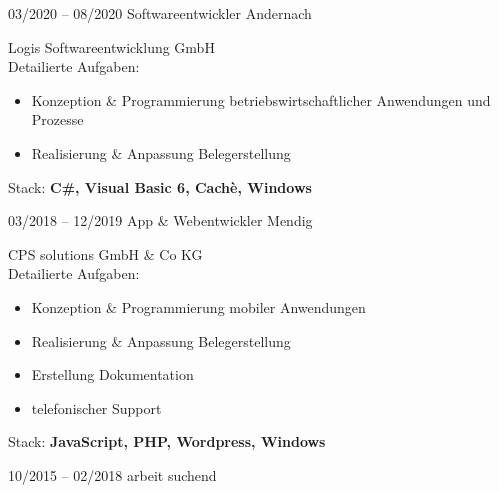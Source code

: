 \documentclass[a4paper]{friggeri-cv} %
\begin{document}
\begin{entrylist}
\entry
{03/2020 -- 08/2020}
{Softwareentwickler}
{Andernach}
{Logis Softwareentwicklung GmbH\\
	Detailierte Aufgaben:
	\begin{itemize}
		\item Konzeption \& Programmierung betriebswirtschaftlicher Anwendungen und Prozesse
		\item Realisierung \& Anpassung Belegerstellung
	\end{itemize}
	Stack: \textbf{C\#, Visual Basic 6, Cachè, Windows}
}
\entry
{03/2018 -- 12/2019}
{App \& Webentwickler}
{Mendig}
{CPS solutions GmbH \& Co KG\\
	Detailierte Aufgaben:
	\begin{itemize}
		\item Konzeption \& Programmierung mobiler Anwendungen
		\item Realisierung \& Anpassung Belegerstellung
        	\item Erstellung Dokumentation
        	\item telefonischer Support
	\end{itemize}
	Stack: \textbf{JavaScript, PHP, Wordpress, Windows}
}
\entry
{10/2015 -- 02/2018}
{arbeit suchend}
{}
{}


\end{entrylist}
\end{document}
